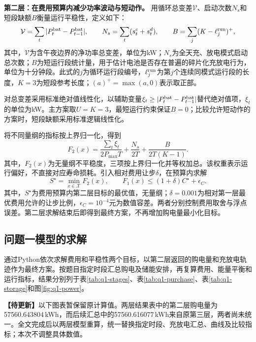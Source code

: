 \documentclass[withoutpreface,bwprint]{cumcmthesis}
\newcommand{\qonepending}[1]{\par\begingroup\small\raggedright\noindent\textbf{【待更新】}#1\par\endgroup}
\begin{document}
\textbf{第二层：在费用预算内减少功率波动与短动作。}
用循环总变差$\mathcal V$、启动次数$N_s$和短段缺额$B$衡量运行平稳性，定义如下：
\begin{equation}
 \mathcal V=\sum_t|P_t^{\rm bat}-P_{t-1}^{\rm bat}|,\qquad
 N_s=\sum_t(s_t^c+s_t^d),\qquad B=\sum_j(K-\ell_j^{\rm run})^+ ,
 \label{eq:q1-diagnostics}
\end{equation}
其中，$\mathcal V$为含午夜边界的净功率总变差，单位为kW；$N_s$为全天充、放电模式启动总次数；$B$为短运行段统计量，用于估计电池是否存在普遍的碎片化充放电行为，单位为十分钟段。此式的$j$为循环运行段编号，$\ell_j^{\rm run}$为第$j$个连续同模式运行段的长度，$K=3$为短段参考长度；$(a)^+=\max(a,0)$表示取正部。


对总变差采用标准绝对值线性化，以辅助变量$\xi_t\geq|P_t^{\rm bat}-P_{t-1}^{\rm bat}|$替代绝对值项，$\xi_t$的单位为kW。主方案取$U=K=3$，最短运行约束保证$B=0$；比较允许短动作的方案时，短段缺额采用标准逻辑线性化。

将不同量纲的指标按上界归一化，得到
\begin{equation}
 F_2(x)=\frac{\sum_t\xi_t}{2P_{\max}T}
       +\frac{N_s}{2T}+\frac{B}{2T(K-1)} .
 \label{eq:q1-second}
\end{equation}
其中，$F_2(x)$为无量纲不平稳度，三项按上界归一化并等权加总。该权重表示运行偏好，不直接对应寿命损耗。引入相对费用让步$\delta$，在预算内求解
\begin{equation}
 S^\star=\min_{x\in\mathcal X}F_2(x),\qquad
 F_1(x)\leq(1+\delta)C^\star+\epsilon_C .
 \label{eq:q1-budget}
\end{equation}
其中，$S^\star$为费用预算内第二层目标的最优值，无量纲；$\delta=0.001$为相对第一层最优费用允许的让步比例，$\epsilon_C=10^{-4}$元为数值容差。两者分别控制费用取舍与浮点误差。第二层求解结束后即得到最终方案，不再增加购电量最小化目标。


\subsection{问题一模型的求解}

通过Python依次求解费用和平稳性两个目标，以第二层返回的购电量和充放电轨迹作为最终方案。按题目指定时段汇总购电及储能安排，再复算费用、能量平衡和运行指标，结果分别列于表\ref{tab:q1-stages}、表\ref{tab:q1-purchase}、表\ref{tab:q1-storage}和图\ref{fig:q1-power}。
\qonepending{以下图表暂保留原计算值。两层结果表中的第二层购电量为57560.643804\,kWh，而后续汇总中的57560.616077\,kWh来自原第三层，两者尚未统一。全文完成后以两层模型重算，统一替换指定时段、充放电汇总、曲线及比较指标；本次不调整具体数值。}
\end{document}

